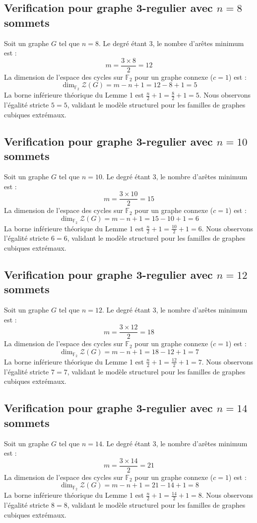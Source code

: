\documentclass[11pt,a4paper]{article}
\begin{document}
\subsection{Verification pour graphe 3-regulier avec $n=8$ sommets}
Soit un graphe $G$ tel que $n = 8$. Le degré étant 3, le nombre d'arêtes minimum est :
$$ m = \frac{3 \times 8}{2} = 12 $$
La dimension de l'espace des cycles sur $\mathbb{F}_2$ pour un graphe connexe ($c=1$) est :
$$ \dim_{\mathbb{F}_2} \mathcal{Z}(G) = m - n + 1 = 12 - 8 + 1 = 5 $$
La borne inférieure théorique du Lemme 1 est $\frac{n}{2} + 1 = \frac{8}{2} + 1 = 5$.
Nous observons l'égalité stricte $5 = 5$, validant le modèle structurel pour les familles de graphes cubiques extrémaux.

\subsection{Verification pour graphe 3-regulier avec $n=10$ sommets}
Soit un graphe $G$ tel que $n = 10$. Le degré étant 3, le nombre d'arêtes minimum est :
$$ m = \frac{3 \times 10}{2} = 15 $$
La dimension de l'espace des cycles sur $\mathbb{F}_2$ pour un graphe connexe ($c=1$) est :
$$ \dim_{\mathbb{F}_2} \mathcal{Z}(G) = m - n + 1 = 15 - 10 + 1 = 6 $$
La borne inférieure théorique du Lemme 1 est $\frac{n}{2} + 1 = \frac{10}{2} + 1 = 6$.
Nous observons l'égalité stricte $6 = 6$, validant le modèle structurel pour les familles de graphes cubiques extrémaux.

\subsection{Verification pour graphe 3-regulier avec $n=12$ sommets}
Soit un graphe $G$ tel que $n = 12$. Le degré étant 3, le nombre d'arêtes minimum est :
$$ m = \frac{3 \times 12}{2} = 18 $$
La dimension de l'espace des cycles sur $\mathbb{F}_2$ pour un graphe connexe ($c=1$) est :
$$ \dim_{\mathbb{F}_2} \mathcal{Z}(G) = m - n + 1 = 18 - 12 + 1 = 7 $$
La borne inférieure théorique du Lemme 1 est $\frac{n}{2} + 1 = \frac{12}{2} + 1 = 7$.
Nous observons l'égalité stricte $7 = 7$, validant le modèle structurel pour les familles de graphes cubiques extrémaux.

\subsection{Verification pour graphe 3-regulier avec $n=14$ sommets}
Soit un graphe $G$ tel que $n = 14$. Le degré étant 3, le nombre d'arêtes minimum est :
$$ m = \frac{3 \times 14}{2} = 21 $$
La dimension de l'espace des cycles sur $\mathbb{F}_2$ pour un graphe connexe ($c=1$) est :
$$ \dim_{\mathbb{F}_2} \mathcal{Z}(G) = m - n + 1 = 21 - 14 + 1 = 8 $$
La borne inférieure théorique du Lemme 1 est $\frac{n}{2} + 1 = \frac{14}{2} + 1 = 8$.
Nous observons l'égalité stricte $8 = 8$, validant le modèle structurel pour les familles de graphes cubiques extrémaux.
\end{document}
